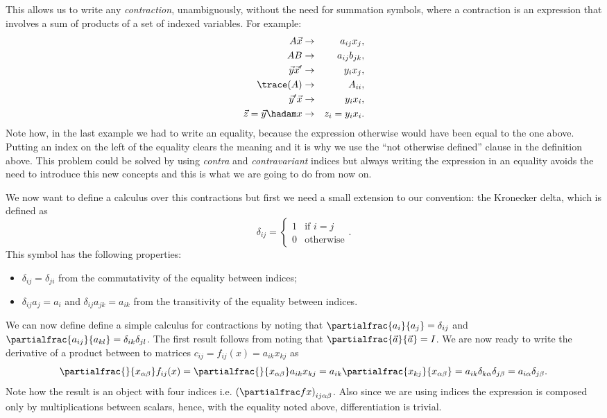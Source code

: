 \documentclass{article}
\begin{document}
This allows us to write any \emph{contraction}, unambiguously, without the need
for summation symbols, where a contraction is an expression that involves a sum
of products of a set of indexed variables. For example:
\begin{eqnarray*}
A \vec x &\rightarrow& a_{ij} x_j, \\
A B &\rightarrow& a_{ij} b_{jk}, \\
\vec y \vec x' &\rightarrow& y_i x_j, \\
\trace(A) &\rightarrow& A_{ii}, \\
\vec y' \vec x &\rightarrow& y_i x_i, \\
\vec z = \vec y \hadam x &\rightarrow& z_i = y_i x_i.
\end{eqnarray*}
Note how, in the last example we had to write an equality, because the
expression otherwise would have been equal to the one above. Putting an index on
the left of the equality clears the meaning and it is why we use
the ``not otherwise defined'' clause in the definition above. This problem could
be solved by using \emph{contra} and \emph{contravariant} indices but always
writing the expression in an equality avoids the need to introduce this new
concepts and this is what we are going to do from now on.

We now want to define a calculus over this contractions but first we need a
small extension to our convention: the Kronecker delta, which is defined as
\[
\delta_{ij} = \left\{\begin{array}{ll}
                     1 & \mbox{if \(i = j\)} \\
                     0 & \mbox{otherwise}
                     \end{array}\right..
\] This symbol has the following properties:
\begin{itemize}
\item \(\delta_{ij} = \delta_{ji}\) from the commutativity of the equality
between indices;
\item \(\delta_{ij} a_j = a_i\) and \(\delta_{ij} a_{jk} = a_{ik}\) from the
transitivity of the equality between indices.
\end{itemize}

We can now define define a simple calculus for contractions by noting that
\(\partialfrac{a_i}{a_j} = \delta_{ij}\) and
\(\partialfrac{a_{ij}}{a_{kl}} = \delta_{ik}\delta_{jl}\). The first result
follows from noting that \(\partialfrac{\vec a}{\vec a} = I\). We are now ready
to write the derivative of a product between to matrices
\(c_{ij} = f_{ij}(x) = a_{ik} x_{kj}\) as \[
\partialfrac{}{x_{\alpha\beta}} f_{ij}(x)
= \partialfrac{}{x_{\alpha\beta}} a_{ik} x_{kj}
= a_{ik} \partialfrac{x_{kj}}{x_{\alpha\beta}}
= a_{ik} \delta_{k\alpha} \delta_{j\beta}
= a_{i\alpha} \delta_{j\beta}.
\] Note how the result is an object with four indices i.e.
\(\left(\partialfrac f x\right)_{ij\alpha\beta}\). Also since we are using
indices the expression is composed only by multiplications between scalars,
hence, with the equality noted above, differentiation is trivial.
\end{document}

